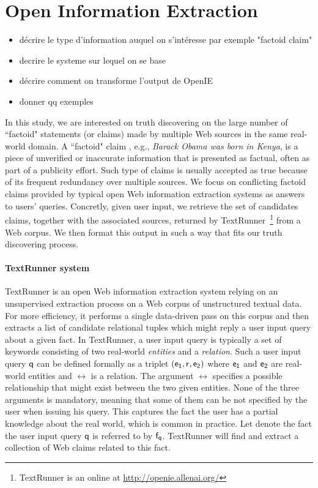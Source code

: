 \section{Open Information Extraction}
\begin{itemize}
 \item décrire le type d'information auquel on s'intéresse par exemple "factoid claim"
 \item decrire le systeme sur lequel on se base
 \item décrire comment on transforme l'output de OpenIE
 \item donner qq exemples
\end{itemize}


In this study, we are interested on truth discovering on the large number of ``factoid" statements
(or claims) made by multiple Web sources in the same real-world domain. A ``factoid" claim , e.g., 
\emph{Barack Obama was born in Kenya}, is
a piece of unverified or inaccurate information that is presented as factual, often
as part of a publicity effort. Such type of claims  is usually accepted as true  because of its
frequent redundancy over multiple sources. We focus on conflicting factoid claims provided by typical 
open Web information extraction systems as answers to users' queries. Concretly, given user input, 
we retrieve the set of candidates claims, together with the associated sources, returned by TextRunner~\footnote{TextRunner is an online
at \href{http://openie.allenai.org/}{http://openie.allenai.org/}}
from a Web corpus. We then format this output in such a way that fits our truth discovering process.



\paragraph*{TextRunner system}
TextRunner is an open Web information extraction system relying
on an unsupervised extraction process on a Web corpus of unstructured textual
data. For more efficiency, it performs a single data-driven pass on 
this corpus and then extracts a list of candidate relational tuples 
which might reply a user input query about a given fact. In TextRunner, 
a user input query is typically a set of keywords
consisting  of two real-world \emph{entities} and a \emph{relation}. Such
a user input query $\mathsf{q}$ can be defined formally as a triplet $(\mathsf{e_{1}}, \mathsf{r}_{}, \mathsf{e_{2}})$
where $\mathsf{e_{1}}$ and $\mathsf{e_{2}}$ are real-world entities and $\rel{}$ is a relation. The argument $\rel{}$ 
specifies a possible relationship that might exist between the two given entities. None of the three 
arguments is mandatory, meaning that some of them can be not specified by the user when issuing 
his query. This captures the fact the user has a partial knowledge about the real world, which is 
common in practice. Let denote the fact the user input query $\mathsf{q}$ is referred to by $\mathsf{f}_{\mathsf{q}}$. 
TextRunner will find and extract a collection of Web claims related to this fact.

